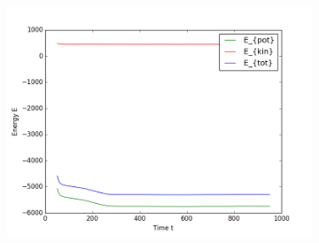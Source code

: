 \begin{figure}[ht]
\begin{subfigure}{0.3\textwidth}
\includegraphics[width=\textwidth]{fig/avEnergies_T0d3_M100.png}
\end{subfigure}
\end{figure}

